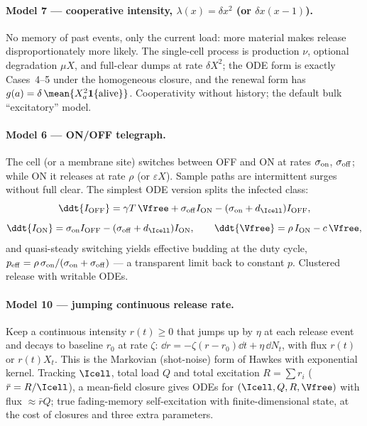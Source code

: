 \paragraph{Model 7 --- cooperative intensity, $\lambda(x)=\delta x^2$
(or $\delta x(x-1)$).} No memory of past events, only the current load:
more material makes release disproportionately more likely. The single-cell
process is production $\nu$, optional degradation $\mu X$, and full-clear
dumps at rate $\delta X^2$; the ODE form is exactly Cases~4--5 under the
homogeneous closure, and the renewal form has
$g(a)=\delta\,\mean{X_a^2\mathbf1\{\text{alive}\}}$. Cooperativity without
history; the default bulk ``excitatory'' model.

\paragraph{Model 6 --- ON/OFF telegraph.} The cell (or a membrane site)
switches between OFF and ON at rates $\sigma_{\rm on}$, $\sigma_{\rm off}$;
while ON it releases at rate $\rho$ (or $\varepsilon X$). Sample paths are
intermittent surges without full clear. The simplest ODE version splits the
infected class:
\begin{equation}
\ddt{I_{\rm OFF}}=\gamma T\,\Vfree+\sigma_{\rm off}I_{\rm ON}
-(\sigma_{\rm on}+d_{\Icell})I_{\rm OFF},
\end{equation}
\begin{equation}
\ddt{I_{\rm ON}}=\sigma_{\rm on}I_{\rm OFF}
-(\sigma_{\rm off}+d_{\Icell})I_{\rm ON},
\qquad
\ddt{\Vfree}=\rho\,I_{\rm ON}-c\,\Vfree,
\end{equation}
and quasi-steady switching yields effective budding at the duty cycle,
$p_{\rm eff}=\rho\,\sigma_{\rm on}/(\sigma_{\rm on}+\sigma_{\rm off})$ ---
a transparent limit back to constant $p$. Clustered release with writable
ODEs.

\paragraph{Model 10 --- jumping continuous release rate.} Keep a continuous
intensity $r(t)\ge0$ that jumps up by $\eta$ at each release event and
decays to baseline $r_0$ at rate $\zeta$:
$\dd r=-\zeta(r-r_0)\dd t+\eta\,\dd N_t$, with flux $r(t)$ or $r(t)X_t$.
This is the Markovian (shot-noise) form of Hawkes with exponential kernel.
Tracking $\Icell$, total load $Q$ and total excitation $R=\sum r_i$
($\bar r=R/\Icell$), a mean-field closure gives ODEs for
$(\Icell,Q,R,\Vfree)$ with flux $\approx\bar r Q$; true fading-memory
self-excitation with finite-dimensional state, at the cost of closures and
three extra parameters.

